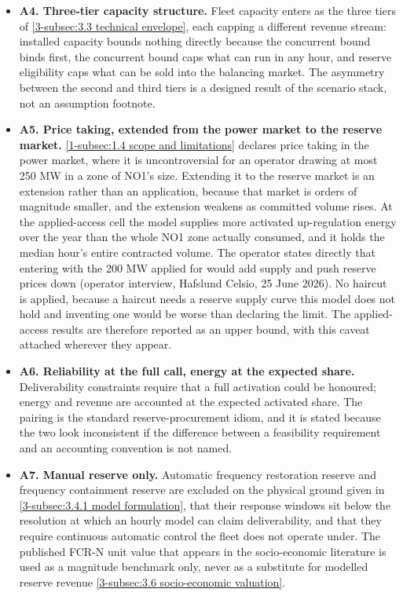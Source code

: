 \begin{itemize}
    \item \textbf{A4. Three-tier capacity structure.} Fleet capacity enters as the three tiers of \autoref{3-subsec:3.3 technical envelope}, each capping a different revenue stream: installed capacity bounds nothing directly because the concurrent bound binds first, the concurrent bound caps what can run in any hour, and reserve eligibility caps what can be sold into the balancing market. The asymmetry between the second and third tiers is a designed result of the scenario stack, not an assumption footnote.

    \item \textbf{A5. Price taking, extended from the power market to the reserve market.} \autoref{1-subsec:1.4 scope and limitations} declares price taking in the power market, where it is uncontroversial for an operator drawing at most 250 MW in a zone of NO1's size. Extending it to the reserve market is an extension rather than an application, because that market is orders of magnitude smaller, and the extension weakens as committed volume rises. At the applied-access cell the model supplies more activated up-regulation energy over the year than the whole NO1 zone actually consumed, and it holds the median hour's entire contracted volume. The operator states directly that entering with the 200 MW applied for would add supply and push reserve prices down (operator interview, Hafslund Celsio, 25 June 2026). No haircut is applied, because a haircut needs a reserve supply curve this model does not hold and inventing one would be worse than declaring the limit. The applied-access results are therefore reported as an upper bound, with this caveat attached wherever they appear.

    \item \textbf{A6. Reliability at the full call, energy at the expected share.} Deliverability constraints require that a full activation could be honoured; energy and revenue are accounted at the expected activated share. The pairing is the standard reserve-procurement idiom, and it is stated because the two look inconsistent if the difference between a feasibility requirement and an accounting convention is not named.

    \item \textbf{A7. Manual reserve only.} Automatic frequency restoration reserve and frequency containment reserve are excluded on the physical ground given in \autoref{3-subsec:3.4.1 model formulation}, that their response windows sit below the resolution at which an hourly model can claim deliverability, and that they require continuous automatic control the fleet does not operate under. The published FCR-N unit value that appears in the socio-economic literature is used as a magnitude benchmark only, never as a substitute for modelled reserve revenue \autoref{3-subsec:3.6 socio-economic valuation}.


\end{itemize}
